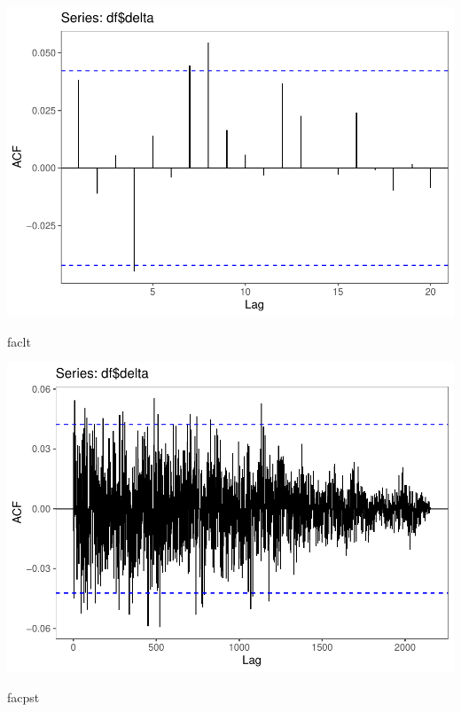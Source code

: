 \documentclass[11pt, a4paper]{report}
\newenvironment{Shaded}{\begin{snugshade}}{\end{snugshade}}
\newcommand{\NormalTok}[1]{#1}
\theoremstyle{plain}
\theoremstyle{plain}
\theoremstyle{remark}
\begin{document}
\begin{center}\includegraphics{Econo2_P1_files/figure-latex/plots-5} \end{center}

\begin{Shaded}
\begin{Highlighting}[]
\NormalTok{faclt}
\end{Highlighting}
\end{Shaded}

\begin{center}\includegraphics{Econo2_P1_files/figure-latex/plots-6} \end{center}

\begin{Shaded}
\begin{Highlighting}[]
\NormalTok{facpst}
\end{Highlighting}
\end{Shaded}
\end{document}

